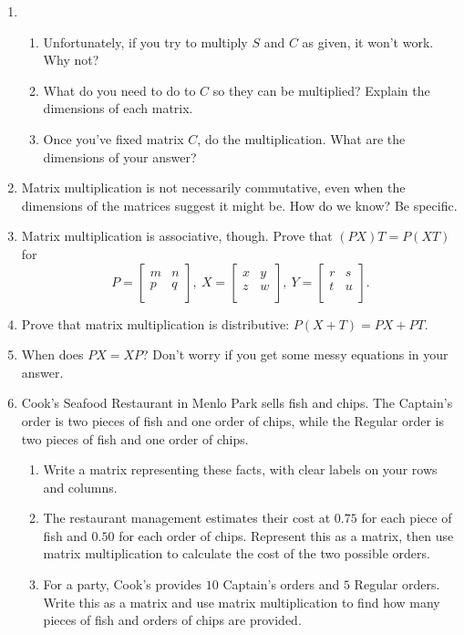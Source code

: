 \documentclass[../gatm_answers.tex]{subfiles}
\begin{document}
\begin{enumerate}
\item \begin{enumerate}
\item Unfortunately, if you try to multiply $S$ and $C$ as given, it won't work. Why not?
\item What do you need to do to $C$ so they can be multiplied? Explain the dimensions of each matrix.
\item Once you've fixed matrix $C$, do the multiplication. What are the dimensions of your answer?
\end{enumerate}
\item Matrix multiplication is not necessarily commutative, even when the dimensions of the matrices suggest it might be. How do we know? Be specific.
\item Matrix multiplication is associative, though. Prove that $(PX)T=P(XT)$ for $$P=\left[\begin{array}{cc} m & n \\ p & q \\ \end{array}\right],\: X=\left[\begin{array}{cc} x & y \\ z & w \\ \end{array}\right],\: Y=\left[\begin{array}{cc} r & s \\ t & u \\ \end{array}\right].$$
\item Prove that matrix multiplication is distributive: $P(X+T)=PX+PT$.
\item When does $PX=XP$? Don't worry if you get some messy equations in your answer.
\item Cook's Seafood Restaurant in Menlo Park sells fish and chips. The Captain's order is two pieces of fish and one order of chips, while the Regular order is two pieces of fish and one order of chips.
\begin{enumerate}
\item Write a matrix representing these facts, with clear labels on your rows and columns.
\item The restaurant management estimates their cost at $0.75$ for each piece of fish and $0.50$ for each order of chips. Represent this as a matrix, then use matrix multiplication to calculate the cost of the two possible orders.
\item For a party, Cook's provides $10$ Captain's orders and $5$ Regular orders. Write this as a matrix and use matrix multiplication to find how many pieces of fish and orders of chips are provided.

\end{enumerate}
\end{enumerate}
\end{document}
